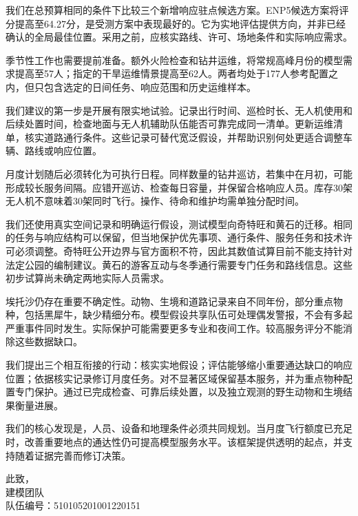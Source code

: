 \documentclass[12pt,a4paper]{article}
\newcommand{\TeamNumber}{510105201001220151}
\numberwithin{equation}{section}
\begin{document}
我们在总预算相同的条件下比较三个新增响应驻点候选方案。ENP5候选方案将评分提高至64.27分，是受测方案中表现最好的。它为实地评估提供方向，并非已经确认的全局最佳位置。采用之前，应核实路线、许可、场地条件和实际响应需求。

季节性工作也需要提前准备。额外火险检查和钻井运维，将常规高峰月份的模型需求提高至57人；指定的干旱运维情景提高至62人。两者均处于177人参考配置之内，但只包含选定的日间任务、响应范围和历史运维样本。
\clearpage

我们建议的第一步是开展有限实地试验。记录出行时间、巡检时长、无人机使用和后续处置时间，检查地面与无人机辅助队伍能否可靠完成同一清单。更新运维清单，核实道路通行条件。这些记录可替代宽泛假设，并帮助识别何处更适合调整车辆、路线或响应位置。

月度计划随后必须转化为可执行日程。同样数量的钻井巡访，若集中在月初，可能形成较长服务间隔。应错开巡访、检查每日容量，并保留合格响应人员。库存30架无人机不意味着30架同时飞行。操作、待命和维护均需单独分配时间。

我们还使用真实空间记录和明确运行假设，测试模型向奇特旺和黄石的迁移。相同的任务与响应结构可以保留，但当地保护优先事项、通行条件、服务任务和技术许可必须调整。奇特旺公开边界与官方面积不符，因此其数值试算目前不能支持针对法定公园的编制建议。黄石的游客互动与冬季通行需要专门任务和路线信息。这些初步试算尚未确定两地实际人员需求。

埃托沙仍存在重要不确定性。动物、生境和道路记录来自不同年份，部分重点物种，包括黑犀牛，缺少精细分布。模型假设共享队伍可处理偶发警报，不会有多起严重事件同时发生。实际保护可能需要更多专业和夜间工作。较高服务评分不能消除这些数据缺口。

我们提出三个相互衔接的行动：核实实地假设；评估能够缩小重要通达缺口的响应位置；依据核实记录修订月度任务。对不显著区域保留基本服务，并为重点物种配置专门保护。通过已完成检查、可靠后续处置，以及独立观测的野生动物和生境结果衡量进展。

我们的核心发现是，人员、设备和地理条件必须共同规划。当月度飞行额度已充足时，改善重要地点的通达性仍可提高模型服务水平。该框架提供透明的起点，并支持随着证据完善而修订决策。

此致，\\[5pt]
建模团队\\
队伍编号：\TeamNumber
\clearpage
\end{document}
